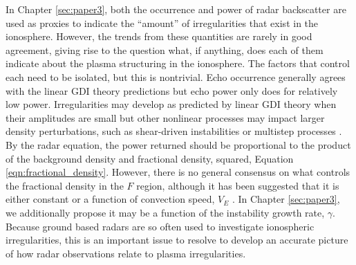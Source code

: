 In Chapter \ref{sec:paper3}, both the occurrence and power of radar backscatter are used as proxies to indicate the ``amount'' of irregularities that exist in the ionosphere.  However, the trends from these quantities are rarely in good agreement, giving rise to the question what, if anything, does each of them indicate about the plasma structuring in the ionosphere.  The factors that control each need to be isolated, but this is nontrivial.  Echo occurrence generally agrees with the linear GDI theory predictions but echo power only does for relatively low power.  Irregularities may develop as predicted by linear GDI theory when their amplitudes are small but other nonlinear processes may impact larger density perturbations, such as shear-driven instabilities \citep{Gondarenko2006} or multistep processes \citep{Carlson2012}.  By the radar equation, the power returned should be proportional to the product of the background density and fractional density, squared, Equation \ref{eqn:fractional_density}.  However, there is no general consensus on what controls the fractional density in the \(F\) region, although it has been suggested that it is either constant or a function of convection speed, \(V_E\) \citep{Kustov1988,Haldoupis1990,Makarevich2014b}.  In Chapter \ref{sec:paper3}, we additionally propose it may be a function of the instability growth rate, \(\gamma\).  Because ground based radars are so often used to investigate ionospheric irregularities, this is an important issue to resolve to develop an accurate picture of how radar observations relate to plasma irregularities.



